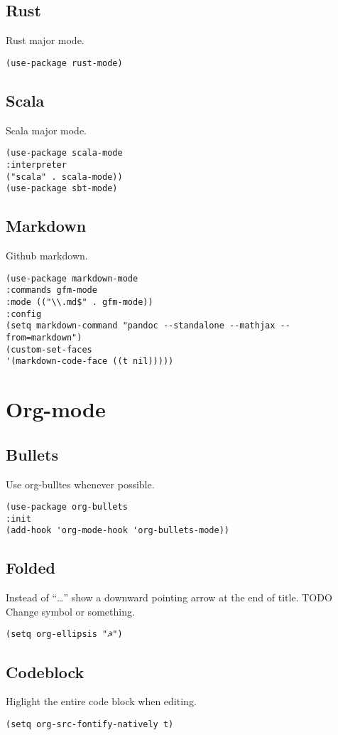 \documentclass[11pt]{article}
\begin{document}
\subsection*{Rust}
\label{sec:org087f1fb}
Rust major mode.
\begin{verbatim}
(use-package rust-mode)
\end{verbatim}
\subsection*{Scala}
\label{sec:orga261279}
Scala major mode.
\begin{verbatim}
(use-package scala-mode
:interpreter
("scala" . scala-mode))
(use-package sbt-mode)
\end{verbatim}
\subsection*{Markdown}
\label{sec:org3759148}
Github markdown.
\begin{verbatim}
(use-package markdown-mode
:commands gfm-mode
:mode (("\\.md$" . gfm-mode))
:config
(setq markdown-command "pandoc --standalone --mathjax --from=markdown")
(custom-set-faces
'(markdown-code-face ((t nil)))))
\end{verbatim}
\section*{Org-mode}
\label{sec:org77f3fe0}
\subsection*{Bullets}
\label{sec:orgdd0fbfb}
Use org-bulltes whenever possible.
\begin{verbatim}
(use-package org-bullets
:init
(add-hook 'org-mode-hook 'org-bullets-mode))
\end{verbatim}
\subsection*{Folded}
\label{sec:orgd3e32f4}
Instead of ``\ldots{}'' show a downward pointing arrow at the end of title.
TODO Change symbol or something.
\begin{verbatim}
(setq org-ellipsis "☭")
\end{verbatim}
\subsection*{Codeblock}
\label{sec:orga8dd3a4}
Higlight the entire code block when editing.
\begin{verbatim}
(setq org-src-fontify-natively t)
\end{verbatim}
\end{document}
